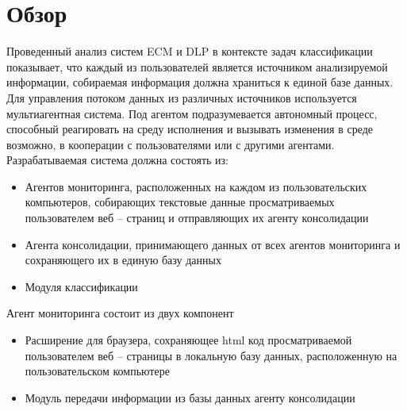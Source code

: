 \documentclass[russian, utf8, emptystyle]{eskdtext}
\begin{document}
\section{Обзор}
Проведенный анализ систем ECM и DLP  в контексте задач классификации показывает, что каждый из пользователей является источником анализируемой информации, собираемая информация должна храниться к единой базе данных. Для управления потоком данных из различных источников используется мультиагентная система. Под агентом подразумевается  автономный процесс, способный реагировать на среду исполнения и вызывать изменения в среде возможно, в кооперации с пользователями или с другими агентами.\\
Разрабатываемая система должна состоять из:
\begin{itemize}
	\item Агентов мониторинга, расположенных на каждом из пользовательских компьютеров, собирающих текстовые данные просматриваемых пользователем веб – страниц и отправляющих их агенту консолидации
	\item Агента консолидации, принимающего данных от всех агентов мониторинга и сохраняющего их в единую базу данных
	\item Модуля классификации
\end{itemize}
Агент мониторинга состоит из двух компонент
\begin{itemize}
	\item Расширение для браузера, сохраняющее html код просматриваемой пользователем веб – страницы в локальную базу данных, расположенную на пользовательском компьютере
	\item Модуль передачи информации из базы данных агенту консолидации
\end{itemize}
\end{document}
